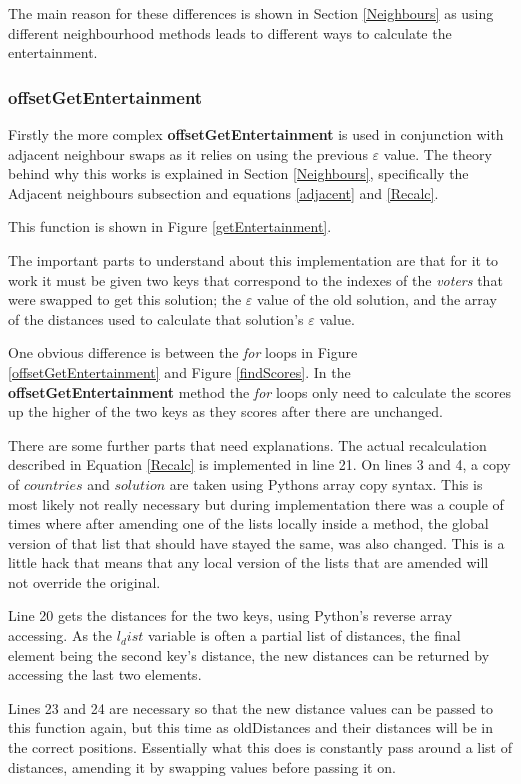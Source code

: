 \documentclass[12pt]{report}
\begin{document}
The main reason for these differences is shown in Section \ref{Neighbours} as using different neighbourhood methods leads to different ways to calculate the entertainment. 

\subsubsection{offsetGetEntertainment}
Firstly the more complex \textbf{offsetGetEntertainment} is used in conjunction with adjacent neighbour swaps as it relies on using the previous $\varepsilon$ value. The theory behind why this works is explained in Section \ref{Neighbours}, specifically the Adjacent neighbours subsection and equations \ref{adjacent} and \ref{Recalc}.

This function is shown in Figure \ref{getEntertainment}.

The important parts to understand about this implementation are that for it to work it must be given two keys that correspond to the indexes of the \textit{voters} that were swapped to get this solution; the $\varepsilon$ value of the old solution, and the array of the distances used to calculate that solution's $\varepsilon$ value.

One obvious difference is between the \textit{for} loops in Figure \ref{offsetGetEntertainment} and Figure \ref{findScores}. In the \textbf{offsetGetEntertainment} method the \textit{for} loops only need to calculate the scores up the higher of the two keys as they scores after there are unchanged.

There are some further parts that need explanations. The actual recalculation described in Equation \ref{Recalc} is implemented in line 21. On lines 3 and 4, a copy of $countries$ and $solution$ are taken using Pythons array copy syntax. This is most likely not really necessary but during implementation there was a couple of times where after amending one of the lists locally inside a method, the global version of that list that should have stayed the same, was also changed. This is a little hack that means that any local version of the lists that are amended will not override the original. 

Line 20 gets the distances for the two keys, using Python's reverse array accessing. As the $l_dist$ variable is often a partial list of distances, the final element being the second key's distance, the new distances can be returned by accessing the last two elements.

Lines 23 and 24 are necessary so that the new distance values can be passed to this function again, but this time as oldDistances and their distances will be in the correct positions. Essentially what this does is constantly pass around a list of distances, amending it by swapping values before passing it on.
\end{document}
